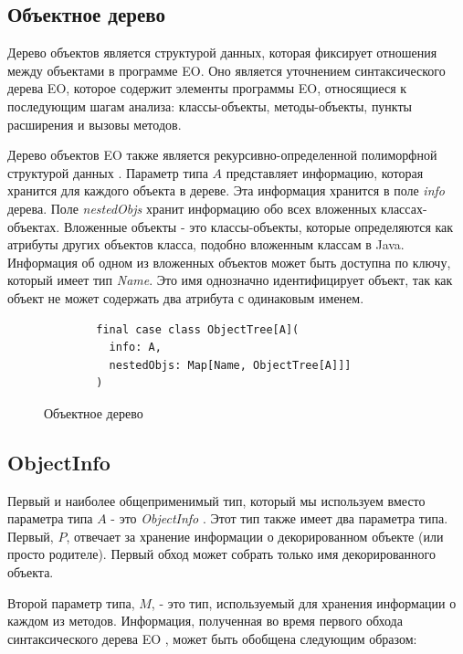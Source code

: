 \subsection{Объектное дерево}
Дерево объектов является структурой данных, которая фиксирует отношения между объектами в программе EO. Оно является уточнением синтаксического дерева EO, которое содержит элементы программы EO, относящиеся к последующим шагам анализа: классы-объекты, методы-объекты, пункты расширения и вызовы методов. 

Дерево объектов EO также является рекурсивно-определенной полиморфной структурой данных . Параметр типа $A$ представляет информацию, которая хранится для каждого объекта в дереве. Эта информация хранится в поле \textit{info} дерева. Поле \textit{nestedObjs} хранит информацию обо всех вложенных классах-объектах. Вложенные объекты - это классы-объекты, которые определяются как атрибуты других объектов класса, подобно вложенным классам в Java. Информация об одном из вложенных объектов может быть доступна по ключу, который имеет тип \textit{Name}. Это имя однозначно идентифицирует объект, так как объект не может содержать два атрибута с одинаковым именем.  

\begin{figure}
    \begin{lstlisting}
        final case class ObjectTree[A](
          info: A,
          nestedObjs: Map[Name, ObjectTree[A]]]
        ) 
    \end{lstlisting}
    \caption{Объектное дерево}
    \label{fig:objtree}
\end{figure}

\subsection{ObjectInfo}

Первый и наиболее общеприменимый тип, который мы используем вместо параметра типа $A$ - это \textit{ObjectInfo} . Этот тип также имеет два параметра типа. Первый, $P$, отвечает за хранение информации о декорированном объекте (или просто родителе). Первый обход может собрать только имя декорированного объекта. 

Второй параметр типа, $M$, - это тип, используемый для хранения информации о каждом из методов. Информация, полученная во время первого обхода синтаксического дерева EO , может быть обобщена следующим образом:

